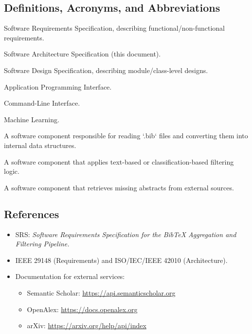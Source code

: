 \documentclass[12pt]{article}
\begin{document}
\subsection{Definitions, Acronyms, and Abbreviations}
\begin{description}[style=nextline]
  \item[SRS] Software Requirements Specification, describing functional/non-functional requirements.
  \item[SAS] Software Architecture Specification (this document).
  \item[SDS] Software Design Specification, describing module/class-level designs.
  \item[API] Application Programming Interface.
  \item[CLI] Command-Line Interface.
  \item[ML] Machine Learning.
  \item[Parsing Module] A software component responsible for reading `.bib` files and converting them into internal data structures.
  \item[Filtering Module] A software component that applies text-based or classification-based filtering logic.
  \item[Augmentation Module] A software component that retrieves missing abstracts from external sources.
\end{description}

\subsection{References}
\begin{itemize}
  \item SRS: \emph{Software Requirements Specification for the BibTeX Aggregation and Filtering Pipeline.}
  \item IEEE 29148 (Requirements) and ISO/IEC/IEEE 42010 (Architecture).
  \item Documentation for external services:
  \begin{itemize}
    \item Semantic Scholar: \url{https://api.semanticscholar.org}
    \item OpenAlex: \url{https://docs.openalex.org}
    \item arXiv: \url{https://arxiv.org/help/api/index}
  \end{itemize}
\end{itemize}

\end{document}
